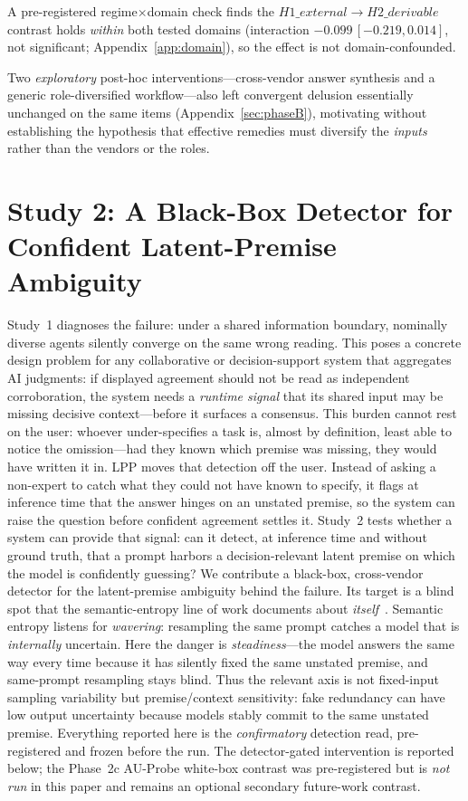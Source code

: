 \documentclass[acmsmall,screen,review,anonymous]{acmart}
\begin{document}
A pre-registered regime$\times$domain check finds the $H1\_external \rightarrow H2\_derivable$ contrast holds
\emph{within} both tested domains (interaction $-0.099\,[-0.219,0.014]$, not significant;
Appendix~\ref{app:domain}), so the effect is not domain-confounded.

Two \emph{exploratory} post-hoc interventions---cross-vendor answer synthesis and a generic
role-diversified workflow---also left convergent delusion essentially unchanged on the same items
(Appendix~\ref{sec:phaseB}), motivating without establishing the hypothesis that effective remedies must
diversify the \emph{inputs} rather than the vendors or the roles.

\section{Study 2: A Black-Box Detector for Confident Latent-Premise Ambiguity}
\label{sec:study2}
Study~1 diagnoses the failure: under a shared information boundary, nominally diverse agents silently
converge on the same wrong reading. This poses a concrete design problem for any collaborative or
decision-support system that aggregates AI judgments: if displayed agreement should not be read as
independent corroboration, the system needs a \emph{runtime signal} that its shared input may be missing
decisive context---before it surfaces a consensus. This burden cannot rest on the user: whoever
under-specifies a task is, almost by definition, least able to notice the omission---had they known which
premise was missing, they would have written it in. LPP moves that detection off the user. Instead of asking
a non-expert to catch what they could not have known to specify, it flags at inference time that the answer
hinges on an unstated premise, so the system can raise the question before confident agreement settles it. Study~2 tests whether a system can provide that signal:
can it detect, at inference time and without ground truth, that a prompt harbors a decision-relevant latent
premise on which the model is confidently guessing? We contribute a black-box,
cross-vendor detector for the latent-premise ambiguity behind the failure. Its target is a blind spot that the semantic-entropy line
of work documents about \emph{itself}~\cite{farquhar2024semantic}. Semantic entropy listens for
\emph{wavering}: resampling the same prompt catches a model that is \emph{internally} uncertain. Here the
danger is \emph{steadiness}---the model answers the same way every time because it has silently fixed the same
unstated premise, and same-prompt resampling stays blind. Thus the relevant axis is not
fixed-input sampling variability but premise/context sensitivity: fake redundancy can have low output
uncertainty because models stably commit to the same unstated premise. Everything reported here is the
\emph{confirmatory} detection read, pre-registered and frozen before the run. The detector-gated intervention
is reported below; the Phase~2c AU-Probe white-box contrast was pre-registered but is \emph{not run} in this
paper and remains an optional secondary future-work contrast.
\end{document}
